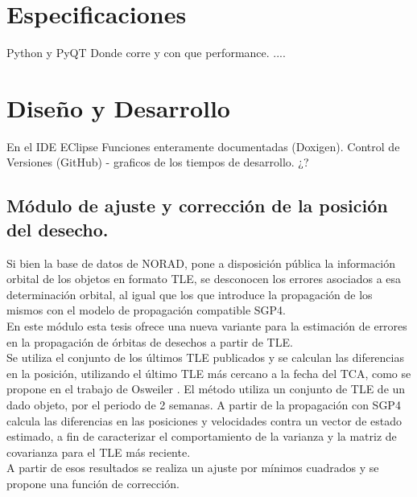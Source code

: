 \section{Especificaciones}
Python y PyQT
Donde corre y con que performance.
....


\section{Diseño y Desarrollo}
En el IDE EClipse
Funciones enteramente documentadas (Doxigen).
Control de Versiones (GitHub) - graficos de los tiempos de desarrollo. ¿?



\subsection*{M\'odulo de ajuste y correcci\'on de la posici\'on del desecho.}
Si bien la base de datos de NORAD, pone a disposici\'on p\'ublica la informaci\'on orbital de los objetos en formato TLE, se desconocen los errores asociados a esa determinaci\'on orbital, al igual que los que introduce la propagaci\'on de los mismos con el modelo de propagaci\'on compatible SGP4.\\
En este m\'odulo esta tesis ofrece una nueva variante para la estimaci\'on de errores en la propagaci\'on de \'orbitas de desechos a partir de TLE.\\
Se utiliza el conjunto de los \'ultimos TLE publicados y se calculan las diferencias en la posici\'on, utilizando el \'ultimo TLE m\'as cercano a la fecha del TCA, como se propone en el trabajo de Osweiler \cite{osweiler}. El m\'etodo utiliza un conjunto de TLE de un dado objeto, por el periodo de 2 semanas. A partir de la propagaci\'on con SGP4 calcula las diferencias en las posiciones y velocidades contra un vector de estado estimado, a fin de caracterizar el comportamiento de la varianza y la matriz de covarianza para el TLE m\'as reciente.\\
A partir de esos resultados se realiza un ajuste por m\'inimos cuadrados y se propone una funci\'on de corrección.\\

